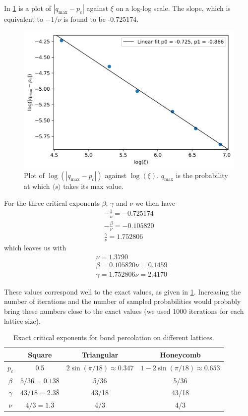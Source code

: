 \documentclass[a4paper]{article}
\begin{document}
In \cref{fig:qmax_vs_xi} is a plot of $|q_\text{max} - p_c|$ against $\xi$ on a log-log scale. The slope, which is equivalent to $-1/\nu$ is found to be -0.725174.
\begin{figure}[h]
    \centering
    \includegraphics[width=\textwidth]{qmax_vs_xi.png}
    \caption{Plot of $\log(|q_\text{max} - p_c|)$ against $\log(\xi)$. $q_\text{max}$ is the probability at which $\langle s \rangle$ takes its max value. \label{fig:qmax_vs_xi}}
\end{figure}

For the three critical exponents $\beta$, $\gamma$ and $\nu$ we then have
\begin{align*}
    -\frac{1}{\nu} = -0.725174 \\
    -\frac{\beta}{\nu} = -0.105820 \\
    \frac{\gamma}{\nu} = 1.752806
\end{align*}
which leaves us with
\begin{align*}
    &\nu = 1.3790 \\
    &\beta = 0.105820\nu = 0.1459 \\
    &\gamma = 1.752806\nu = 2.4170
\end{align*}

These values correspond well to the exact values, as given in \cref{tab:critical}. Increasing the number of iterations and the number of sampled probabilities would probably bring these numbers close to the exact values (we used 1000 iterations for each lattice size).
\begin{table}[!h]
\centering
\caption{Exact critical exponents for bond percolation on different lattices. \label{tab:critical}}
\begin{tabular}{cccc}
\hline
& Square & Triangular & Honeycomb \\
\hline
$p_c$ & 0.5 & $2\sin(\pi/18) \approx 0.347$ & $1 - 2\sin(\pi/18) \approx 0.653$ \\
$\beta$ & $5/36=0.13\overline{8}$ & 5/36 & 5/36 \\
$\gamma$ & $43/18=2.3\overline{8}$ & 43/18 & 43/18 \\
$\nu$ & $4/3=1.\overline{3}$ & 4/3 & 4/3 \\
\hline
\end{tabular}
\end{table}
\FloatBarrier
\end{document}
